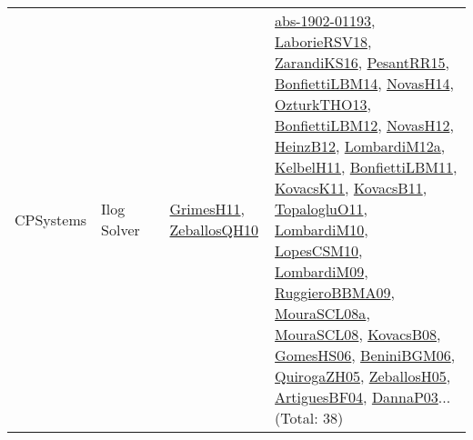 {\begin{longtable}{lp{3cm}>{\raggedright}p{6cm}>{\raggedright}p{6cm}p{8cm}}
CPSystems & Ilog Solver &  & \href{papers/GrimesH11.pdf}{GrimesH11}\cite{GrimesH11}, \href{articles/ZeballosQH10.pdf}{ZeballosQH10}\cite{ZeballosQH10} & \href{articles/abs-1902-01193.pdf}{abs-1902-01193}\cite{abs-1902-01193}, \href{articles/LaborieRSV18.pdf}{LaborieRSV18}\cite{LaborieRSV18}, \href{articles/ZarandiKS16.pdf}{ZarandiKS16}\cite{ZarandiKS16}, \href{papers/PesantRR15.pdf}{PesantRR15}\cite{PesantRR15}, \href{articles/BonfiettiLBM14.pdf}{BonfiettiLBM14}\cite{BonfiettiLBM14}, \href{articles/NovasH14.pdf}{NovasH14}\cite{NovasH14}, \href{articles/OzturkTHO13.pdf}{OzturkTHO13}\cite{OzturkTHO13}, \href{papers/BonfiettiLBM12.pdf}{BonfiettiLBM12}\cite{BonfiettiLBM12}, \href{articles/NovasH12.pdf}{NovasH12}\cite{NovasH12}, \href{papers/HeinzB12.pdf}{HeinzB12}\cite{HeinzB12}, \href{articles/LombardiM12a.pdf}{LombardiM12a}\cite{LombardiM12a}, \href{articles/KelbelH11.pdf}{KelbelH11}\cite{KelbelH11}, \href{papers/BonfiettiLBM11.pdf}{BonfiettiLBM11}\cite{BonfiettiLBM11}, \href{articles/KovacsK11.pdf}{KovacsK11}\cite{KovacsK11}, \href{articles/KovacsB11.pdf}{KovacsB11}\cite{KovacsB11}, \href{articles/TopalogluO11.pdf}{TopalogluO11}\cite{TopalogluO11}, \href{papers/LombardiM10.pdf}{LombardiM10}\cite{LombardiM10}, \href{articles/LopesCSM10.pdf}{LopesCSM10}\cite{LopesCSM10}, \href{papers/LombardiM09.pdf}{LombardiM09}\cite{LombardiM09}, \href{articles/RuggieroBBMA09.pdf}{RuggieroBBMA09}\cite{RuggieroBBMA09}, \href{papers/MouraSCL08a.pdf}{MouraSCL08a}\cite{MouraSCL08a}, \href{papers/MouraSCL08.pdf}{MouraSCL08}\cite{MouraSCL08}, \href{articles/KovacsB08.pdf}{KovacsB08}\cite{KovacsB08}, \href{papers/GomesHS06.pdf}{GomesHS06}\cite{GomesHS06}, \href{papers/BeniniBGM06.pdf}{BeniniBGM06}\cite{BeniniBGM06}, \href{papers/QuirogaZH05.pdf}{QuirogaZH05}\cite{QuirogaZH05}, \href{articles/ZeballosH05.pdf}{ZeballosH05}\cite{ZeballosH05}, \href{papers/ArtiguesBF04.pdf}{ArtiguesBF04}\cite{ArtiguesBF04}, \href{papers/DannaP03.pdf}{DannaP03}\cite{DannaP03}... (Total: 38)\\

\end{longtable}}
